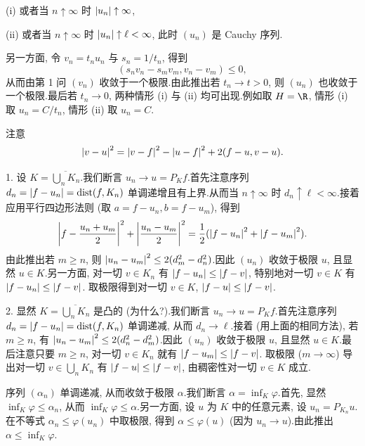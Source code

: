 (i) 或者当 $n\uparrow\infty$ 时 $\left|u_n\right|\uparrow\infty$,

(ii) 或者当 $n\uparrow\infty$ 时 $\left|u_n\right|\uparrow\ell<\infty$, 此时 $(u_n)$ 是 Cauchy 序列.

另一方面, 令 $v_n=t_nu_n$ 与 $s_n=1/t_n$, 得到
\begin{equation*}
(s_nv_n-s_mv_m,v_n-v_m)\le0,
\end{equation*}
从而由第 1 问 $(v_n)$ 收敛于一个极限.由此推出若 $t_n\to t>0$, 则 $(u_n)$
也收敛于一个极限.最后若 $t_n\to0$, 两种情形 (i) 与 (ii) 均可出现.例如取
$H=\R$, 情形 (i) 取 $u_n=C/t_n$, 情形 (ii) 取 $u_n=C$.


注意
\begin{equation*}
\left|v-u\right|^2=\left|v-f\right|^2-\left|u-f\right|^2+2(f-u,v-u).
\end{equation*}


1. 设 $K=\overline{\bigcup_nK_n}$.我们断言 $u_n\to u=P_Kf$.首先注意序列
$d_n=\left|f-u_n\right|=\operatorname{dist}(f,K_n)$ 单调递增且有上界.从而当 $n\uparrow\infty$
时 $d_n\uparrow\ell<\infty$.接着应用平行四边形法则 (取 $a=f-u_n,b=f-u_m$),
得到
\begin{equation*}
\left|f-\frac{u_n+u_m}{2}\right|^2+\left|\frac{u_n-u_m}{2}\right|^2
=\frac12(\left|f-u_n\right|^2+\left|f-u_m\right|^2).
\end{equation*}
由此推出若 $m\ge n$, 则 $\left|u_n-u_m\right|^2\le2(d_m^2-d_n^2)$.因此 $(u_n)$
收敛于极限 $u$, 且显然 $u\in K$.另一方面, 对一切 $v\in K_n$ 有
$\left|f-u_n\right|\le\left|f-v\right|$, 特别地对一切 $v\in K$ 有 $\left|f-u_n\right|\le\left|f-v\right|$.
取极限得到对一切 $v\in K$, $\left|f-u\right|\le\left|f-v\right|$.

2. 显然 $K=\overline{\bigcup_nK_n}$ 是凸的 (为什么?).我们断言
$u_n\to u=P_Kf$.首先注意序列 $d_n=\left|f-u_n\right|=\operatorname{dist}(f,K_n)$ 单调递减,
从而 $d_n\to\ell$.接着 (用上面的相同方法), 若 $m\ge n$, 有
$\left|u_n-u_m\right|^2\le2(d_n^2-d_m^2)$.因此 $(u_n)$ 收敛于极限 $u$, 且显然
$u\in K$.最后注意只要 $m\ge n$, 对一切 $v\in K_n$ 就有 $\left|f-u_m\right|\le\left|f-v\right|$.
取极限 ($m\to\infty$) 导出对一切 $v\in\bigcup_nK_n$ 有 $\left|f-u\right|\le\left|f-v\right|$,
由稠密性对一切 $v\in K$ 成立.

序列 $(\alpha_n)$ 单调递减, 从而收敛于极限 $\alpha$.我们断言
$\alpha=\inf_K\varphi$.首先, 显然 $\inf_K\varphi\le\alpha_n$, 从而
$\inf_K\varphi\le\alpha$.另一方面, 设 $u$ 为 $K$ 中的任意元素, 设
$u_n=P_{K_n}u$.在不等式 $\alpha_n\le\varphi(u_n)$ 中取极限, 得到
$\alpha\le\varphi(u)$ (因为 $u_n\to u$).由此推出 $\alpha\le\inf_K\varphi$.

